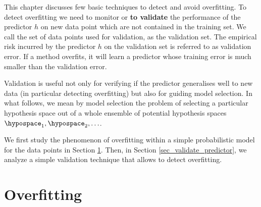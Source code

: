 \documentclass[12pt]{report}
\begin{document}
This chapter discusses few basic techniques to detect and avoid overfitting. 
To detect overfitting we need to monitor or {\bf to validate} the performance of 
the predictor $h$ on new data point which are not contained in the training set. 
We call the set of data points used for validation, as the validation set. The empirical 
risk incurred by the predictor $h$ on the validation set is referred to as validation error. 
If a method overfits, it will learn a predictor whose training error is much smaller than 
the validation error. 
%
%

Validation is useful not only for verifying if the predictor generalises well to 
new data (in particular detecting overfitting) but also for guiding model selection. 
In what follows, we mean by model selection the problem of selecting a 
particular hypothesis space out of a whole ensemble of potential hypothesis spaces $\hypospace_{1},\hypospace_{2},\ldots$.

We first study the phenomenon of overfitting within a simple probabilistic model for 
the data points in Section \ref{sec_overfitting_sec_6}. Then, in Section \ref{sec_validate_predictor}, 
we analyze a simple validation technique that allows to detect overfitting. 


\section{Overfitting}
\label{sec_overfitting_sec_6}
\end{document}
